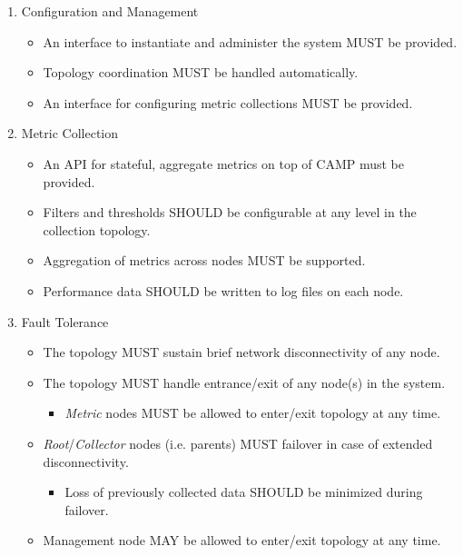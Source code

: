 \begin{enumerate}

\item Configuration and Management
      \begin{itemize}
      \item An interface to instantiate and administer the system MUST be provided.
      \item Topology coordination MUST be handled automatically.
      \item An interface for configuring metric collections MUST be provided.
      \end{itemize}

\item Metric Collection
      \begin{itemize}
      \item An API for stateful, aggregate metrics on top of CAMP must be provided.
      \item Filters and thresholds SHOULD be configurable at any level in the collection topology.
      \item Aggregation of metrics across nodes MUST be supported.
      \item Performance data SHOULD be written to log files on each node.
      \end{itemize}

\item Fault Tolerance
      \begin{itemize}
      \item The topology MUST sustain brief network disconnectivity of any node.
      \item The topology MUST handle entrance/exit of any node(s) in the system.
            \begin{itemize}
            \item \textit{Metric} nodes MUST be allowed to enter/exit topology at any time.
            \end{itemize}
      \item \textit{Root}/\textit{Collector} nodes (i.e. parents) MUST failover in case of extended disconnectivity.
            \begin{itemize}
            \item Loss of previously collected data SHOULD be minimized during failover.
            \end{itemize}
      \item Management node MAY be allowed to enter/exit topology at any time.
      \end{itemize}

\end{enumerate}

